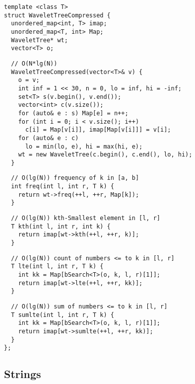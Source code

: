 \documentclass[twoside]{article}
\begin{document}
\begin{multicols*}{2}
\begin{verbatim}
template <class T>
struct WaveletTreeCompressed {
  unordered_map<int, T> imap;
  unordered_map<T, int> Map;
  WaveletTree* wt;
  vector<T> o;
\end{verbatim}
\vspace{-12pt}
\begin{verbatim}
  // O(N*lg(N))
  WaveletTreeCompressed(vector<T>& v) {
    o = v;
    int inf = 1 << 30, n = 0, lo = inf, hi = -inf;
    set<T> s(v.begin(), v.end());
    vector<int> c(v.size());
    for (auto& e : s) Map[e] = n++;
    for (int i = 0; i < v.size(); i++)
      c[i] = Map[v[i]], imap[Map[v[i]]] = v[i];
    for (auto& e : c)
      lo = min(lo, e), hi = max(hi, e);
    wt = new WaveletTree(c.begin(), c.end(), lo, hi);
  }
\end{verbatim}
\vspace{-12pt}
\begin{verbatim}
  // O(lg(N)) frequency of k in [a, b]
  int freq(int l, int r, T k) {
    return wt->freq(++l, ++r, Map[k]);
  }
\end{verbatim}
\vspace{-12pt}
\begin{verbatim}
  // O(lg(N)) kth-Smallest element in [l, r]
  T kth(int l, int r, int k) {
    return imap[wt->kth(++l, ++r, k)];
  }
\end{verbatim}
\vspace{-12pt}
\begin{verbatim}
  // O(lg(N)) count of numbers <= to k in [l, r]
  T lte(int l, int r, T k) {
    int kk = Map[bSearch<T>(o, k, l, r)[1]];
    return imap[wt->lte(++l, ++r, kk)];
  }
\end{verbatim}
\vspace{-12pt}
\begin{verbatim}
  // O(lg(N)) sum of numbers <= to k in [l, r]
  T sumlte(int l, int r, T k) {
    int kk = Map[bSearch<T>(o, k, l, r)[1]];
    return imap[wt->sumlte(++l, ++r, kk)];
  }
};
\end{verbatim}

\subsectionfont{\bfseries\sffamily\centering\LARGE}
\vspace{0em}
\subsection*{Strings}
\vspace{2em}
\subsubsectionfont{\large\bfseries\sffamily\underline}

\end{multicols*}
\end{document}
